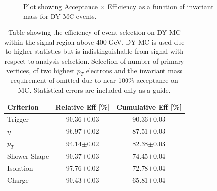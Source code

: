    \begin{figure}[h]
      \begin{center}
      \end{center}
   \caption{Plot showing Acceptance $\times$ Efficiency as a function of invariant mass for DY MC events.}
   \label{fig:AxE}
   \end{figure}


   \begin {table}[h]
      \begin{center}
      \begin{tabular}{|l|c|c|}
         \hline
         \hline
         Criterion & Relative Eff [\%] & Cumulative Eff [\%] \\
         \hline
         Trigger & 90.36$\pm$0.03 & 90.36$\pm$0.03 \\
         $\eta$ & 96.97$\pm$0.02 & 87.51$\pm$0.03 \\
         $p_{T}$ & 94.14$\pm$0.02 & 82.38$\pm$0.03 \\
         Shower Shape & 90.37$\pm$0.03 & 74.45$\pm$0.04 \\
         Isolation & 97.76$\pm$0.02 & 72.78$\pm$0.04 \\
         Charge & 90.43$\pm$0.03 & 65.81$\pm$0.04 \\
         \hline
         \hline
      \end{tabular}
      \caption{Table showing the efficiency of event selection on DY MC within the signal region above 400 GeV. DY MC is used due to higher statistics but is indistinguishable from signal with respect to analysis selection. Selection of number of primary vertices, of two highest $p_{T}$ electrons and the invariant mass requirement of omitted due to near 100\% acceptance on MC. Statistical errors are included only as a guide.}
      \label{tab:eventEff}
      \end{center}
   \end {table}




